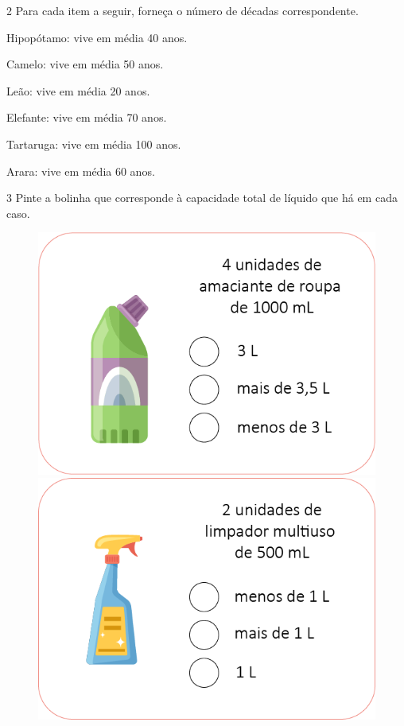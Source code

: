 
\num{2} Para cada item a seguir, forneça o número de décadas correspondente.

\begin{escolha}
\item Hipopótamo: vive em média 40 anos.


\item Camelo: vive em média 50 anos.


\item Leão: vive em média 20 anos.


\item Elefante: vive em média 70 anos.


\item Tartaruga: vive em média 100 anos.


\item Arara: vive em média 60 anos.

\end{escolha}


\num{3} Pinte a bolinha que corresponde à capacidade total de líquido que há em cada caso.

\begin{figure}[htpb!]
\includegraphics[width=.5\textwidth]{media/image21.png}
\includegraphics[width=.5\textwidth]{media/image22.png}
\end{figure}

